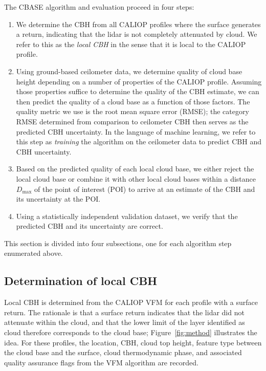 \documentclass[essd,manuscript]{copernicus}\usepackage[]{graphicx}\usepackage[]{color}
\begin{document}
The CBASE algorithm and evaluation proceed in four steps:
\begin{enumerate}
\item We determine the CBH from all CALIOP profiles where the
  surface generates a return, indicating that the lidar is not completely
  attenuated by cloud.  We refer to this as the \textit{local
    CBH} in the sense that it is local to the CALIOP profile.
\item Using ground-based ceilometer data, we determine quality of cloud base
  height depending on a number of properties of the CALIOP profile.  Assuming
  those properties suffice to determine the quality of the CBH estimate, we
  can then predict the quality of a cloud base as a function of those factors.
  The quality metric we use is the root mean square error (RMSE); the category
  RMSE determined from comparison to ceilometer CBH then serves as the predicted
  CBH uncertainty.  In the language of machine learning, we refer to this step
  as \textit{training} the algorithm on the ceilometer data to predict CBH and
  CBH uncertainty.
\item Based on the predicted quality of each local cloud base, we either reject
  the local cloud base or combine it with other local cloud bases within a
  distance $D_\text{max}$ of the point of interest (POI) to arrive at an 
  estimate of the CBH and its uncertainty at the POI.
\item Using a statistically independent validation dataset, we verify that the
  predicted CBH and its uncertainty are correct.
\end{enumerate}

This section is divided into four subsections, one for each algorithm step
enumerated above.

\subsection{Determination of local CBH}
\label{sec:algorithm:local}
Local CBH is determined from the CALIOP VFM for each profile with a surface
return.  The rationale is that a surface return indicates that the lidar did not
attenuate within the cloud, and that the lower limit of the layer identified as
cloud therefore corresponds to the cloud base; Figure~\ref{fig:method}
illustrates the idea.  For these profiles, the location, CBH, cloud top height,
feature type between the cloud base and the surface,
cloud thermodynamic phase, and associated quality assurance flags from the VFM
algorithm are recorded.
\end{document}
